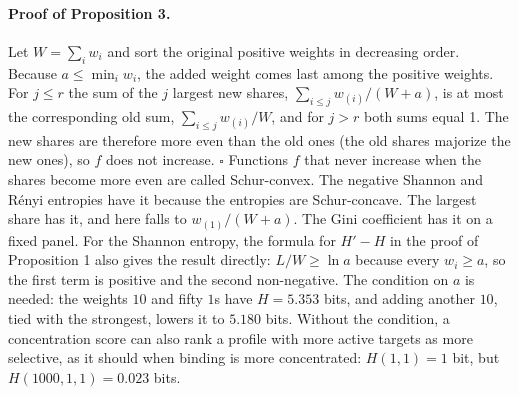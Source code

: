 \documentclass[11pt]{article}
\begin{document}
\paragraph{Proof of Proposition 3.} Let $W = \sum_i w_i$ and sort the
original positive weights in decreasing order. Because $a \leq \min_i w_i$, the
added weight comes last among the positive weights. For $j \leq r$ the sum of
the $j$ largest new shares, $\sum_{i \leq j} w_{(i)}/(W + a)$, is at most the
corresponding old sum, $\sum_{i \leq j} w_{(i)}/W$, and for $j > r$ both sums
equal 1. The new shares are therefore more even than the old ones (the old
shares majorize the new ones), so $f$ does not increase. $\square$
Functions $f$ that never increase when the shares become more even are called
Schur-convex. The negative Shannon and
R\'enyi entropies have it because the entropies are Schur-concave. The largest
share has it, and here falls to $w_{(1)}/(W + a)$. The Gini coefficient has
it on a fixed panel. For the Shannon
entropy, the formula for $H' - H$ in the proof of Proposition 1 also gives the
result directly: $L/W \geq \ln a$ because every $w_i \geq a$, so the first term
is positive and the second non-negative. The condition on $a$ is
needed: the weights $10$ and fifty $1$s have $H = 5.353$ bits, and adding
another $10$, tied with the strongest, lowers it to $5.180$ bits. Without the
condition, a concentration score can also rank a profile with more active
targets as more selective, as it should when binding is more concentrated:
$H(1, 1) = 1$ bit, but $H(1000, 1, 1) = 0.023$ bits.
\end{document}
